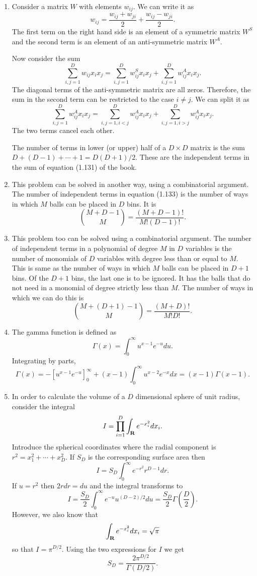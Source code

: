 \begin{enumerate}
\item Consider a matrix $W$ with elements $w_{ij}$. We can write it as
\[
w_{ij} = \frac{w_{ij} + w_{ji}}{2} + \frac{w_{ij} - w_{ji}}{2}.
\]
The first term on the right hand side is an element of a symmetric matrix $W^S$ and the second term 
is an element of an anti-symmetric matrix $W^A$.

Now consider the sum
\[
\sum_{i,j=1}^D w_{ij} x_ix_j = \sum_{i,j=1}^D w_{ij}^S x_ix_j + \sum_{i,j=1}^D w_{ij}^A x_ix_j.
\]
The diagonal terms of the anti-symmetric matrix are all zeros. Therefore, the sum in the second term
can be restricted to the case $i \ne j$. We can split it as
\[
\sum_{i,j=1}^D w_{ij}^A x_ix_j = \sum_{i,j=1, i < j}^D w_{ij}^A x_ix_j + \sum_{i,j=1, i > j}^D w_{ij}^A x_ix_j.
\]
The two terms cancel each other.

The number of terms in lower (or upper) half of a $D \times D$ matrix is the sum $D + (D-1) + \cdots + 1
= D(D+1)/2$. These are the independent terms in the sum of equation (1.131) of the book.

\item This problem can be solved in another way, using a combinatorial argument. The number of
independent terms in equation (1.133) is the number of ways in which $M$ balls can be placed in
$D$ bins. It is
\[
\binom{M + D - 1}{M} = \frac{(M + D - 1)!}{M!(D - 1)!}.
\]

\item This problem too can be solved using a combinatorial argument. The number of independent
terms in a polynomial of degree $M$ in $D$ variables is the number of monomials of $D$
variables with degree less than or equal to $M$. This is same as the number of ways in which
$M$ balls can be placed in $D + 1$ bins. Of the $D + 1$ bins, the last one is to be ignored.
It has the balls that do not need in a monomial of degree strictly less than $M$. The number
of ways in which we can do this is
\[
\binom{M + (D + 1) - 1}{M} = \frac{(M + D)!}{M! D!}.
\]

\item The gamma function is defined as
\[
\Gamma(x) = \int_0^\infty u^{x-1} e^{-u}du.
\]
Integrating by parts,
\[
\Gamma(x) = -[u^{x-1}e^{-u}]_0^\infty + (x - 1)\int_0^\infty u^{x-2}e^{-x}dx = (x - 1)\Gamma(x - 1).
\]

\item In order to calculate the volume of a $D$ dimensional sphere of unit radius, consider 
the integral
\[
I = \prod_{i=1}^D \int_{\mathbf{R}} e^{-x_i^2}dx_i.
\]
Introduce the spherical coordinates where the radial component is $r^2 = x_1^2 + \cdots + x_D^2$.
If $S_D$ is the corresponding surface area then
\[
I = S_D\int_0^\infty e^{-r^2}r^{D-1}dr.
\]
If $u = r^2$ then $2rdr = du$ and the integral transforms to
\[
I = \frac{S_D}{2}\int_0^\infty e^{-u}u^{(D - 2)/2}du = \frac{S_D}{2}\Gamma\left(\frac{D}{2}\right).
\]
However, we also know that
\[
\int_{\mathbf{R}} e^{-x_i^2}dx_i = \sqrt{\pi}
\]
so that $I = \pi^{D/2}$. Using the two expressions for $I$ we get
\begin{equation}\label{c1pe16}
S_D = \frac{2\pi^{D/2}}{\Gamma(D/2)}.
\end{equation}


\end{enumerate}
